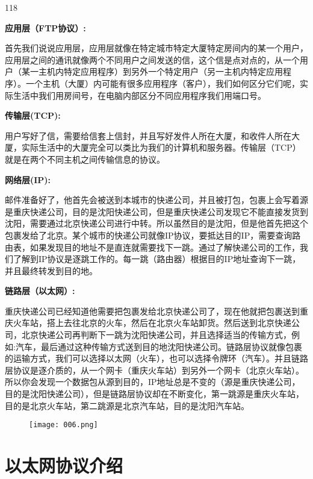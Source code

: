 \documentclass[cn,chinese,color=cyan]{elegantbook}
\begin{document}
\begin{dinglist}{118}
	\item \textbf{应用层（FTP协议）:}
	
	首先我们说说应用层，应用层就像在特定城市特定大厦特定房间内的某一个用户，应用层之间的通讯就像两个不同用户之间发送的信，这个信是点对点的，从一个用户（某一主机内特定应用程序）到另外一个特定用户（另一主机内特定应用程序）。一个主机（大厦）内可能有很多应用程序（客户），我们如何区分它们呢，实际生活中我们用房间号，在电脑内部区分不同应用程序我们用端口号。
	
	\item \textbf{传输层(TCP):}
	
	用户写好了信，需要给信套上信封，并且写好发件人所在大厦，和收件人所在大厦，实际生活中的大厦完全可以类比为我们的计算机和服务器。传输层（TCP）就是在两个不同主机之间传输信息的协议。
	
	\item\textbf{ 网络层(IP):}
	
	邮件准备好了，他首先会被送到本城市的快递公司，并且被打包，包裹上会写着源是重庆快递公司，目的是沈阳快递公司，但是重庆快递公司发现它不能直接发货到沈阳，需要通过北京快递公司进行中转。所以虽然目的是沈阳，但是他首先把这个包裹发给了北京。某个城市的快递公司就像IP协议，要抵达目的IP，需要查询路由表，如果发现目的地址不是直连就需要找下一跳。通过了解快递公司的工作，我们了解到IP协议是逐跳工作的。每一跳（路由器）根据目的IP地址查询下一跳，并且最终转发到目的地。
	
	\item \textbf{链路层（以太网）:}
	
	重庆快递公司已经知道他需要把包裹发给北京快递公司了，现在他就把包裹送到重庆火车站，搭上去往北京的火车，然后在北京火车站卸货。然后送到北京快递公司，北京快递公司再判断下一跳为沈阳快递公司，并且选择适当的传输方式，例如:汽车，最后通过这种传输方式送到目的地沈阳快递公司。链路层协议就像包裹的运输方式，我们可以选择以太网（火车），也可以选择令牌环（汽车）。并且链路层协议是逐介质的，从一个网卡（重庆火车站）到另外一个网卡（北京火车站）。
	所以你会发现一个数据包从源到目的，IP地址总是不变的（源是重庆快递公司，目的是沈阳快递公司），但是链路层协议却在不断变化，第一跳源是重庆火车站，目的是北京火车站，第二跳源是北京汽车站，目的是沈阳汽车站。
\end{dinglist}



\begin{figure}[H]
	\centering
	\texttt{[image: 006.png]}
\end{figure}
\section{以太网协议介绍}
\end{document}
